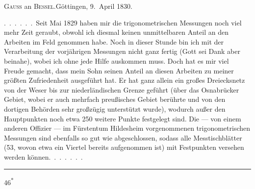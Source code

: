 \begin{center}
\textsc{Gauss} an \textsc{Bessel}.\quad Göttingen, 9.~April 1830.
\end{center}

\par\noindent\hspace*{\parindent}.\ .\ .\ .\ .\ .\ Seit Mai 1829 haben mir die trigonometrischen Messungen noch viel mehr Zeit geraubt, obwohl ich diesmal keinen unmittelbaren Anteil an den Arbeiten im Feld genommen habe.
Noch in dieser Stunde bin ich mit der Verarbeitung der vorjährigen Messungen nicht ganz fertig (Gott sei Dank aber beinahe), wobei ich ohne jede Hilfe auskommen muss.
Doch hat es mir viel Freude gemacht, dass mein Sohn seinen Anteil an diesen Arbeiten zu meiner größten Zufriedenheit ausgeführt hat.
Er hat ganz allein ein großes Dreiecksnetz von der Weser bis zur niederländischen Grenze geführt (über das Osnabrücker Gebiet, wobei er auch mehrfach preußisches Gebiet berührte und von den dortigen Behörden sehr großzügig unterstützt wurde), wodurch außer den Hauptpunkten noch etwa 250 weitere Punkte festgelegt sind.
Die --- von einem anderen Offizier --- im Fürstentum Hildesheim vorgenommenen trigonometrischen Messungen sind ebenfalls so gut wie abgeschlossen, sodass alle Messtischblätter (53, wovon etwa ein Viertel bereits aufgenommen ist) mit Festpunkten versehen werden können.\ .\ .\ .\ .\ .\ .

\begin{center}\rule{.24\linewidth}{.4pt}\end{center}
\par\smallskip\noindent\hfill{\footnotesize 46\textsuperscript{*}}\par
